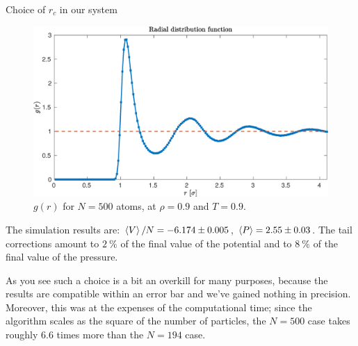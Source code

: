 \documentclass[10pt, compress, protectframetitle, handout]{beamer}
\begin{document}
\begin{frame}[allowframebreaks]{Choice of $r_c$ in our system}
	\begin{figure}
		\includegraphics[width=\textwidth]{g(r)_N500}
		\caption{$g(r)$ for $N=500$ atoms, at $\rho=0.9$ and $T=0.9$.}
	\end{figure}
	
	The simulation results are: $\Braket{V}/N = -6.174 \pm 0.005$, $\Braket{P} = 2.55 \pm 0.03$. The tail corrections amount to $\SI{2}{\percent}$ of the final value of the potential and to $\SI{8}{\percent}$ of the final value of the pressure.
	
	As you see such a choice is a bit an \alert{overkill} for many purposes, because the results are compatible within an error bar and we've gained nothing in precision. Moreover, this was at the expenses of the computational time; since the algorithm scales as the square of the number of particles, the $N=500$ case takes roughly $6.6$ times more than the $N=194$ case.
	
\end{frame}
\end{document}
